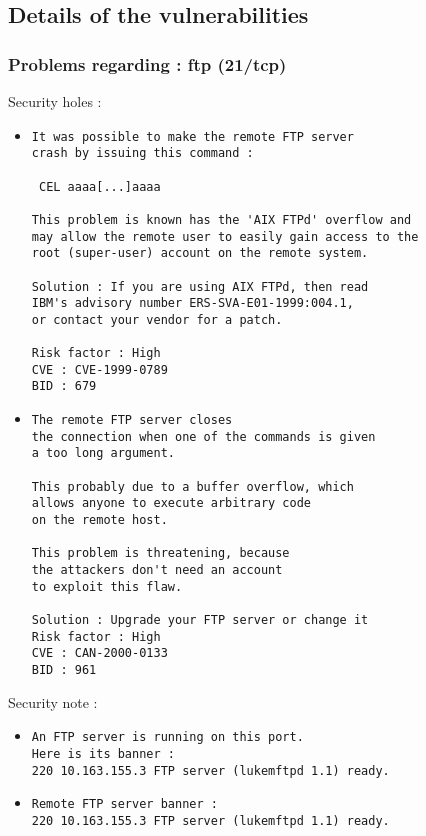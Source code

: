 \documentclass{article}
\begin{document}
\subsection{Details of the vulnerabilities}
\subsubsection{Problems regarding : ftp (21/tcp)}
Security holes :\\
\begin{itemize}
\item \begin{verbatim}
It was possible to make the remote FTP server
crash by issuing this command :

 CEL aaaa[...]aaaa

This problem is known has the 'AIX FTPd' overflow and
may allow the remote user to easily gain access to the 
root (super-user) account on the remote system.

Solution : If you are using AIX FTPd, then read
IBM's advisory number ERS-SVA-E01-1999:004.1,
or contact your vendor for a patch.

Risk factor : High
CVE : CVE-1999-0789
BID : 679
\end{verbatim}\item \begin{verbatim}
The remote FTP server closes
the connection when one of the commands is given
a too long argument. 

This probably due to a buffer overflow, which
allows anyone to execute arbitrary code
on the remote host.

This problem is threatening, because
the attackers don't need an account 
to exploit this flaw.

Solution : Upgrade your FTP server or change it
Risk factor : High
CVE : CAN-2000-0133
BID : 961
\end{verbatim}\end{itemize}
Security note :\\
\begin{itemize}
\item \begin{verbatim}
An FTP server is running on this port.
Here is its banner : 
220 10.163.155.3 FTP server (lukemftpd 1.1) ready.
\end{verbatim}\item \begin{verbatim}
Remote FTP server banner :
220 10.163.155.3 FTP server (lukemftpd 1.1) ready.
\end{verbatim}\end{itemize}
\end{document}
